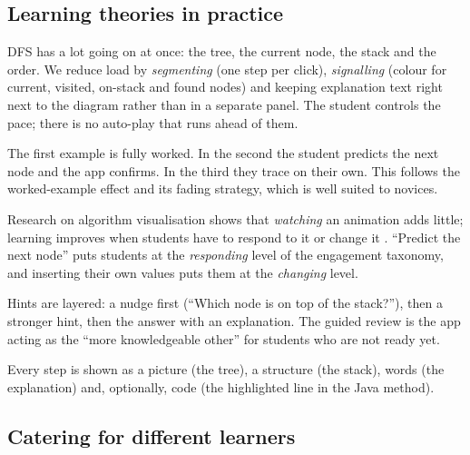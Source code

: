 \documentclass[11pt,a4paper]{article}
\begin{document}
\subsection{Learning theories in practice}

\begin{description}[style=nextline, leftmargin=1.2em]
  \item[Cognitive load theory \cite{sweller1988}.] DFS has a lot going on at once: the tree, the
        current node, the stack and the order. We reduce load by \emph{segmenting} (one step per
        click), \emph{signalling} (colour for current, visited, on-stack and found nodes) and
        keeping explanation text right next to the diagram rather than in a separate panel. The
        student controls the pace; there is no auto-play that runs ahead of them.
  \item[Worked examples and fading.] The first example is fully worked. In the second the student
        predicts the next node and the app confirms. In the third they trace on their own. This
        follows the worked-example effect and its fading strategy, which is well suited to novices.
  \item[Active learning and engagement.] Research on algorithm visualisation shows that
        \emph{watching} an animation adds little; learning improves when students have to respond
        to it or change it \cite{hundhausen2002, naps2002}. ``Predict the next node'' puts students
        at the \emph{responding} level of the engagement taxonomy, and inserting their own values
        puts them at the \emph{changing} level.
  \item[Scaffolding and the zone of proximal development \cite{vygotsky1978}.] Hints are layered:
        a nudge first (``Which node is on top of the stack?''), then a stronger hint, then the
        answer with an explanation. The guided review is the app acting as the ``more
        knowledgeable other'' for students who are not ready yet.
  \item[Dual coding and multiple representations \cite{mayer2009}.] Every step is shown as a
        picture (the tree), a structure (the stack), words (the explanation) and, optionally,
        code (the highlighted line in the Java method).
\end{description}

\subsection{Catering for different learners}
\end{document}
